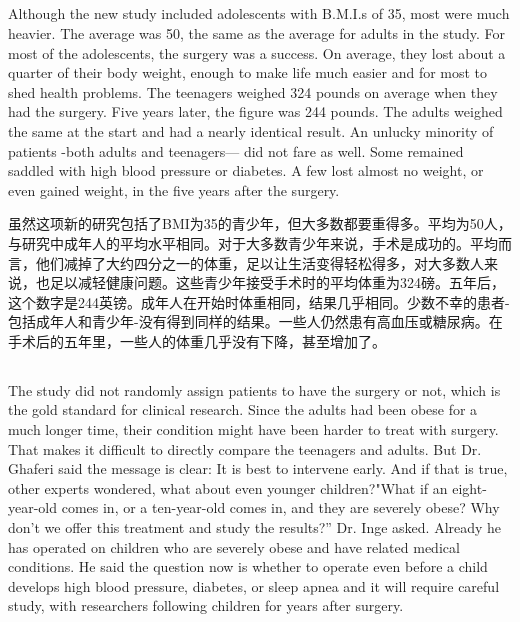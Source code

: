 \documentclass[]{article}
\begin{document}
\subsection{}
\begin{spacing}{2.0}
	{\Large Although the new study included adolescents with B.M.I.s of 35, most were much heavier. The average was 50, the same as the average for adults in the study. For most of the adolescents, the surgery was a success. On average, they lost about a quarter of their body weight, enough to make life much easier and for most to shed health problems. The teenagers weighed 324 pounds on average when they had the surgery. Five years later, the figure was
	244 pounds. The adults weighed the same at the start and had a nearly identical result. An unlucky minority of patients -both adults and teenagers— did not fare as well. Some remained saddled	with high blood pressure or diabetes. A few lost almost no weight, or even gained weight, in the five years after the surgery.}\newline
\end{spacing}

虽然这项新的研究包括了BMI为35的青少年，但大多数都要重得多。平均为50人，与研究中成年人的平均水平相同。对于大多数青少年来说，手术是成功的。平均而言，他们减掉了大约四分之一的体重，足以让生活变得轻松得多，对大多数人来说，也足以减轻健康问题。这些青少年接受手术时的平均体重为324磅。五年后，这个数字是244英镑。成年人在开始时体重相同，结果几乎相同。少数不幸的患者-包括成年人和青少年-没有得到同样的结果。一些人仍然患有高血压或糖尿病。在手术后的五年里，一些人的体重几乎没有下降，甚至增加了。

\subsection{}
\begin{spacing}{2.0}
	{\Large The study did not randomly assign patients to have the surgery or not, which is the gold standard for clinical research. Since the adults had been obese for a much longer time, their condition might have been harder to treat with surgery. That makes it difficult to directly compare the teenagers and adults. But Dr. Ghaferi said the message is clear: It is best to intervene early. And if that is true, other experts wondered, what about even younger children?"What if an eight-year-old comes in, or a ten-year-old comes in, and they are severely obese? Why don't we offer this treatment and study the results?” Dr. Inge asked. Already he has operated on children who are severely obese and have related medical conditions. He said the question now is whether to operate even before a child develops high blood pressure, diabetes, or sleep apnea and it will require careful study, with researchers following children for years after surgery.}\newline
\end{spacing}
\end{document}
